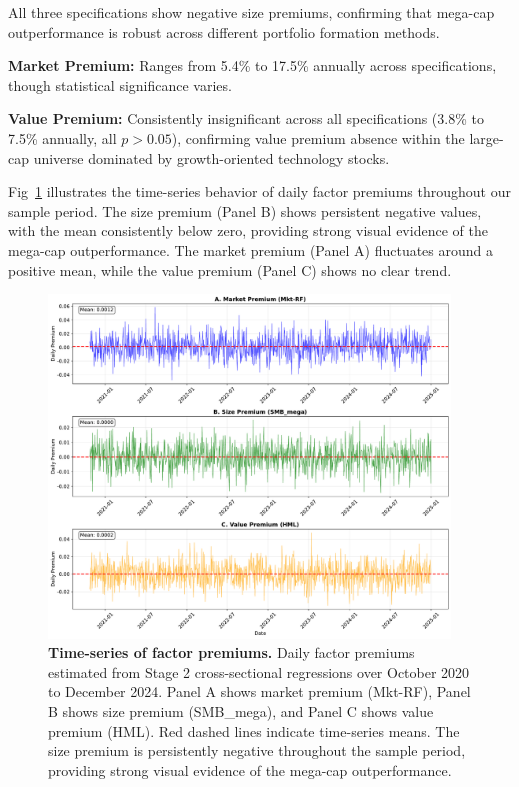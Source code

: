 \documentclass[10pt,letterpaper]{article}
\begin{document}
All three specifications show negative size premiums, confirming that mega-cap outperformance is robust across different portfolio formation methods.

\textbf{Market Premium:} Ranges from 5.4\% to 17.5\% annually across specifications, though statistical significance varies.

\textbf{Value Premium:} Consistently insignificant across all specifications (3.8\% to 7.5\% annually, all $p>0.05$), confirming value premium absence within the large-cap universe dominated by growth-oriented technology stocks.

Fig~\ref{fig:premium_timeseries} illustrates the time-series behavior of daily factor premiums throughout our sample period. The size premium (Panel B) shows persistent negative values, with the mean consistently below zero, providing strong visual evidence of the mega-cap outperformance. The market premium (Panel A) fluctuates around a positive mean, while the value premium (Panel C) shows no clear trend.

\begin{figure}[!h]
\centering
\includegraphics[width=0.95\textwidth]{figures/fig2_premium_timeseries.pdf}
\caption{\textbf{Time-series of factor premiums.}
Daily factor premiums estimated from Stage 2 cross-sectional regressions over October 2020 to December 2024. Panel A shows market premium (Mkt-RF), Panel B shows size premium (SMB\_mega), and Panel C shows value premium (HML). Red dashed lines indicate time-series means. The size premium is persistently negative throughout the sample period, providing strong visual evidence of the mega-cap outperformance.}
\label{fig:premium_timeseries}
\end{figure}
\end{document}
